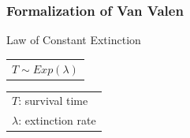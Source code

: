 \documentclass{beamer}
\begin{document}
\begin{frame}
  \frametitle{Formalization of Van Valen}

  \begin{block}{Law of Constant Extinction}
    \begin{center}
      \begin{tabular}{@{}l@{}}\(T \sim Exp(\lambda)\)\end{tabular}
      \hspace{1.5cm}
      \begin{tabular}{@{}l@{}}\(T\): survival time\\\(\lambda\): extinction rate\end{tabular}
    \end{center}
  \end{block}
\end{frame}
\end{document}
